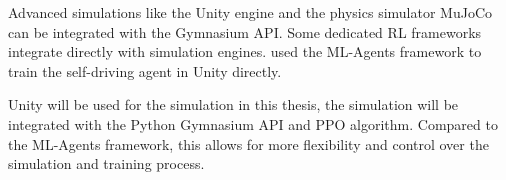 Advanced simulations like the Unity engine \autocite{unity} and the physics simulator MuJoCo \autocite{mujoco} can be integrated with the Gymnasium API.
Some dedicated \ac{RL} frameworks integrate directly with simulation engines. \textcite{maximilian} used the ML-Agents framework \textcite{mlagents} to train the self-driving agent in Unity directly.

Unity will be used for the simulation in this thesis, the simulation will be integrated with the Python Gymnasium API and \ac{PPO} algorithm. Compared to the ML-Agents framework, this allows for more flexibility and control over the simulation and training process.






